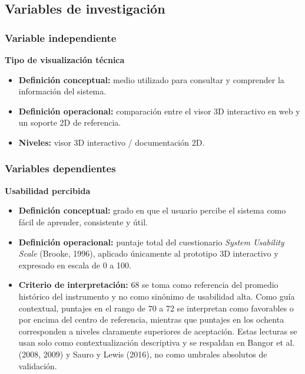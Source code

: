 \subsection{Variables de investigación}

\subsubsection{Variable independiente}

\textbf{Tipo de visualización técnica}
\begin{itemize}
    \item \textbf{Definición conceptual:} medio utilizado para consultar y comprender la información del sistema.
    \item \textbf{Definición operacional:} comparación entre el visor 3D interactivo en web y un soporte 2D de referencia.
    \item \textbf{Niveles:} visor 3D interactivo / documentación 2D.
\end{itemize}

\subsubsection{Variables dependientes}

\textbf{Usabilidad percibida}
\begin{itemize}
    \item \textbf{Definición conceptual:} grado en que el usuario percibe el sistema como fácil de aprender, consistente y útil.
    \item \textbf{Definición operacional:} puntaje total del cuestionario \textit{System Usability Scale} (Brooke, 1996), aplicado únicamente al prototipo 3D interactivo y expresado en escala de 0 a 100.
    \item \textbf{Criterio de interpretación:} 68 se toma como referencia del promedio histórico del instrumento y no como sinónimo de usabilidad alta. Como guía contextual, puntajes en el rango de 70 a 72 se interpretan como favorables o por encima del centro de referencia, mientras que puntajes en los ochenta corresponden a niveles claramente superiores de aceptación. Estas lecturas se usan solo como contextualización descriptiva y se respaldan en Bangor et al. (2008, 2009) y Sauro y Lewis (2016), no como umbrales absolutos de validación.
\end{itemize}

